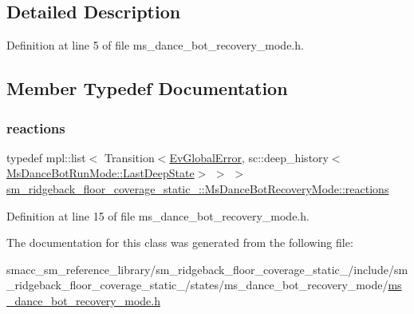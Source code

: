 \subsection{Detailed Description}


Definition at line 5 of file ms\+\_\+dance\+\_\+bot\+\_\+recovery\+\_\+mode.\+h.



\subsection{Member Typedef Documentation}
\mbox{\label{classsm__ridgeback__floor__coverage__static__1_1_1MsDanceBotRecoveryMode_a57e74d1d06f5511f25a1372ce940efc1}} 
\subsubsection{\texorpdfstring{reactions}{reactions}}
{\footnotesize\ttfamily typedef mpl\+::list$<$ Transition$<$\hyperlink{structsm__ridgeback__floor__coverage__static__1_1_1EvGlobalError}{Ev\+Global\+Error}, sc\+::deep\+\_\+history$<$\hyperlink{classsmacc_1_1SmaccState_a60088405d2d99d468caa0baa3b2830a8}{Ms\+Dance\+Bot\+Run\+Mode\+::\+Last\+Deep\+State}$>$ $>$ $>$ \hyperlink{classsm__ridgeback__floor__coverage__static__1_1_1MsDanceBotRecoveryMode_a57e74d1d06f5511f25a1372ce940efc1}{sm\+\_\+ridgeback\+\_\+floor\+\_\+coverage\+\_\+static\+\_\+::\+Ms\+Dance\+Bot\+Recovery\+Mode\+::reactions}}



Definition at line 15 of file ms\+\_\+dance\+\_\+bot\+\_\+recovery\+\_\+mode.\+h.



The documentation for this class was generated from the following file\+:\begin{DoxyCompactItemize}
\item 
smacc\+\_\+sm\+\_\+reference\+\_\+library/sm\+\_\+ridgeback\+\_\+floor\+\_\+coverage\+\_\+static\+\_/include/sm\+\_\+ridgeback\+\_\+floor\+\_\+coverage\+\_\+static\+\_/states/ms\+\_\+dance\+\_\+bot\+\_\+recovery\+\_\+mode/\hyperlink{sm__ridgeback__floor__coverage__static__1_2include_2sm__ridgeback__floor__coverage__static__1_2s442cfa63212c512a388879a3a37381d8}{ms\+\_\+dance\+\_\+bot\+\_\+recovery\+\_\+mode.\+h}\end{DoxyCompactItemize}
